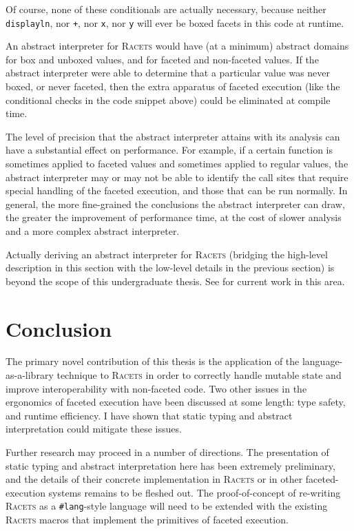 \documentclass{article}
\begin{document}
Of course, none of these conditionals are actually necessary, because neither \texttt{displayln}, nor \texttt{+}, nor \texttt{x}, nor \texttt{y} will ever be boxed facets in this code at runtime.

An abstract interpreter for \textsc{Racets} would have (at a minimum) abstract domains for box and unboxed values, and for faceted and non-faceted values. If the abstract interpreter were able to determine that a particular value was never boxed, or never faceted, then the extra apparatus of faceted execution (like the conditional checks in the code snippet above) could be eliminated at compile time.

The level of precision that the abstract interpreter attains with its analysis can have a substantial effect on performance. For example, if a certain function is sometimes applied to faceted values and sometimes applied to regular values, the abstract interpreter may or may not be able to identify the call sites that require special handling of the faceted execution, and those that can be run normally. In general, the more fine-grained the conclusions the abstract interpreter can draw, the greater the improvement of performance time, at the cost of slower analysis and a more complex abstract interpreter.

Actually deriving an abstract interpreter for \textsc{Racets} (bridging the high-level description in this section with the low-level details in the previous section) is beyond the scope of this undergraduate thesis. See \cite{abstract-inter} for current work in this area.



\section{Conclusion\label{sec:conclusion}}
The primary novel contribution of this thesis is the application of the language-as-a-library technique to \textsc{Racets} in order to correctly handle mutable state and improve interoperability with non-faceted code. Two other issues in the ergonomics of faceted execution have been discussed at some length: type safety, and runtime efficiency. I have shown that static typing and abstract interpretation could mitigate these issues.

Further research may proceed in a number of directions. The presentation of static typing and abstract interpretation here has been extremely preliminary, and the details of their concrete implementation in \textsc{Racets} or in other faceted-execution systems remains to be fleshed out. The proof-of-concept of re-writing \textsc{Racets} as a \texttt{\#lang}-style language will need to be extended with the existing \textsc{Racets} macros that implement the primitives of faceted execution.
\end{document}
